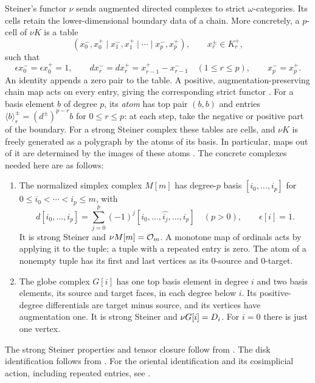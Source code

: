 Steiner's functor $\nu$ sends augmented directed complexes to strict
$\omega$-categories.  Its cells retain the lower-dimensional boundary
data of a chain.  More concretely, a $p$-cell of $\nu K$ is a table
\begin{equation}\label{eq:steiner-cell-table}
 (x_0^-,x_0^+\mid x_1^-,x_1^+\mid\cdots\mid x_p^-,x_p^+),
 \qquad x_r^\pm\in K_r^+,
\end{equation}
such that
\[
 \epsilon x_0^- = \epsilon x_0^+ = 1,\qquad
 d x_r^- = d x_r^+ = x_{r-1}^+-x_{r-1}^-
 \quad(1\le r\le p),\qquad x_p^-=x_p^+.
\]
An identity appends a zero pair to the table.  A positive,
augmentation-preserving chain map acts on every entry, giving the
corresponding strict functor
\cite[Definitions~2.6 and~2.8, Proposition~2.7]{Steiner2004}.
For a basis element $b$ of degree $p$, its \emph{atom} has top pair
$(b,b)$ and entries
$\langle b\rangle_r^\pm=(d^\pm)^{p-r}b$ for $0\le r\le p$:
at each step, take the negative or positive part of the boundary.
For a strong Steiner complex these tables are cells, and $\nu K$ is
freely generated as a polygraph by the atoms of its basis.  In
particular, maps out of it are determined by the images of these atoms
\cite[\S3 before Definition~3.2, Theorem~6.1]{Steiner2004}.
The concrete complexes needed here are as follows:
\begin{enumerate}[label=(\roman*)]
\item
The normalized simplex complex $M[m]$ has degree-$p$ basis
$[i_0,\ldots,i_p]$ for $0\le i_0<\cdots<i_p\le m$, with
\[
 d[i_0,\ldots,i_p]
   =\sum_{j=0}^{p}(-1)^j[i_0,\ldots,\widehat{i_j},\ldots,i_p]
 \quad(p>0),\qquad \epsilon[i]=1.
\]
It is strong Steiner and $\nu M[m]=\mathcal O_{m}$.  A monotone map of
ordinals acts by applying it to the tuple; a tuple with a repeated
entry is zero.  The atom of a nonempty tuple has its first and last
vertices as its $0$-source and $0$-target.
\item
The globe complex $G[i]$ has one top basis element in degree $i$ and
two basis elements, its source and target faces, in each degree below
$i$.  Its positive-degree differentials are target minus source, and
its vertices have augmentation one.  It is strong Steiner and
$\nu G[i]=D_{i}$.  For $i=0$ there is just one vertex.
\end{enumerate}
The strong Steiner properties and tensor closure follow from
\cite[Examples~3.8--3.10]{Steiner2004}. The disk identification follows
from \cite[Example~4.7 and Theorem~5.11]{Steiner2004}. For the oriental
identification and its cosimplicial action, including repeated entries,
see \cite[Theorem~3.2 and \S4 before Theorem~4.1]{Steiner2007}.

